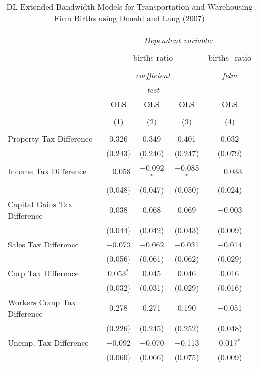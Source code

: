 
\begin{table}[!htbp] \centering 
  \caption{DL Extended Bandwidth Models for  Transportation and Warehousing Firm Births using Donald and Lang (2007)} 
  \label{} 
\begin{tabular}{@{\extracolsep{5pt}}lcccc} 
\\[-1.8ex]\hline 
\hline \\[-1.8ex] 
 & \multicolumn{4}{c}{\textit{Dependent variable:}} \\ 
\cline{2-5} 
\\[-1.8ex] & \multicolumn{3}{c}{births ratio} & births\_ratio \\ 
\\[-1.8ex] & \multicolumn{3}{c}{\textit{coefficient}} & \textit{felm} \\ 
 & \multicolumn{3}{c}{\textit{test}} & \textit{} \\ 
 & OLS & OLS & OLS & OLS \\ 
\\[-1.8ex] & (1) & (2) & (3) & (4)\\ 
\hline \\[-1.8ex] 
 Property Tax Difference & 0.326 & 0.349 & 0.401 & 0.032 \\ 
  & (0.243) & (0.246) & (0.247) & (0.079) \\ 
  Income Tax Difference & $-$0.058 & $-$0.092$^{*}$ & $-$0.085$^{*}$ & $-$0.033 \\ 
  & (0.048) & (0.047) & (0.050) & (0.024) \\ 
  Capital Gains Tax Difference & 0.038 & 0.068 & 0.069 & $-$0.003 \\ 
  & (0.044) & (0.042) & (0.043) & (0.009) \\ 
  Sales Tax Difference & $-$0.073 & $-$0.062 & $-$0.031 & $-$0.014 \\ 
  & (0.056) & (0.061) & (0.062) & (0.029) \\ 
  Corp Tax Difference & 0.053$^{*}$ & 0.045 & 0.046 & 0.016 \\ 
  & (0.032) & (0.031) & (0.029) & (0.016) \\ 
  Workers Comp Tax Difference & 0.278 & 0.271 & 0.190 & $-$0.051 \\ 
  & (0.226) & (0.245) & (0.252) & (0.048) \\ 
  Unemp. Tax Difference & $-$0.092 & $-$0.070 & $-$0.113 & 0.017$^{*}$ \\ 
  & (0.060) & (0.066) & (0.075) & (0.009) \\ 

\end{tabular}
\end{table}

